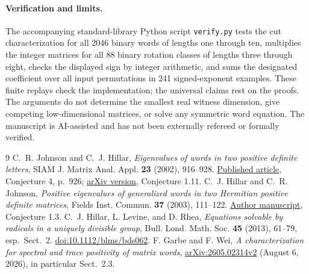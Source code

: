 \documentclass[11pt]{article}
\begin{document}
\paragraph{Verification and limits.}
The accompanying standard-library Python script \texttt{verify.py} tests the cut characterization for all 2046 binary words of lengths one through ten, multiplies the integer matrices for all 88 binary rotation classes of lengths three through eight, checks the displayed sign by integer arithmetic, and sums the designated coefficient over all input permutations in 241 signed-exponent examples. These finite replays check the implementation; the universal claims rest on the proofs. The arguments do not determine the smallest real witness dimension, give competing low-dimensional matrices, or solve any symmetric word equation. The manuscript is AI-assisted and has not been externally refereed or formally verified.

\begin{thebibliography}{9}
C.~R. Johnson and C.~J. Hillar, \emph{Eigenvalues of words in two positive definite letters}, SIAM J. Matrix Anal. Appl. \textbf{23} (2002), 916--928. \href{https://doi.org/10.1137/S0895479801387073}{Published article}, Conjecture 4, p.~926; \href{https://arxiv.org/abs/math/0511411}{arXiv version}, Conjecture 1.11.
C.~J. Hillar and C.~R. Johnson, \emph{Positive eigenvalues of generalized words in two Hermitian positive definite matrices}, Fields Inst. Commun. \textbf{37} (2003), 111--122. \href{https://arxiv.org/abs/math/0504587}{Author manuscript}, Conjecture 1.3.
C.~J. Hillar, L. Levine, and D. Rhea, \emph{Equations solvable by radicals in a uniquely divisible group}, Bull. Lond. Math. Soc. \textbf{45} (2013), 61--79, esp.\ Sect.~2. \href{https://doi.org/10.1112/blms/bds062}{doi:10.1112/blms/bds062}.
F. Garbe and F. Wei, \emph{A characterization for spectral and trace positivity of matrix words}, \href{https://arxiv.org/abs/2605.02314}{arXiv:2605.02314v2} (August 6, 2026), in particular Sect.~2.3.
\end{thebibliography}
\end{document}
